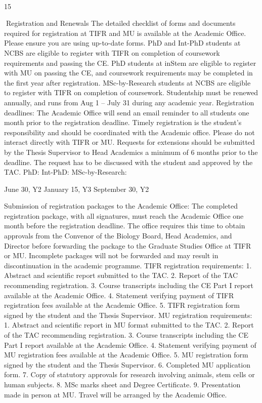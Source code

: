 \documentclass[a4paper,10pt]{article}
\begin{document}
	
  

15	
  

Registration and Renewals
The detailed checklist of forms and documents required for registration at TIFR and MU is
available at the Academic Office. Please ensure you are using up-to-date forms. PhD and
Int-PhD students at NCBS are eligible to register with TIFR on completion of coursework
requirements and passing the CE. PhD students at inStem are eligible to register with MU on
passing the CE, and coursework requirements may be completed in the first year after
registration. MSc-by-Research students at NCBS are eligible to register with TIFR on
completion of coursework. Studentship must be renewed annually, and runs from Aug 1 –
July 31 during any academic year.
Registration deadlines: The Academic Office will send an email reminder to all students
one month prior to the registration deadline. Timely registration is the student’s
responsibility and should be coordinated with the Academic office. Please do not interact
directly with TIFR or MU. Requests for extensions should be submitted by the Thesis
Supervisor to Head Academics a minimum of 6 months prior to the deadline. The request
has to be discussed with the student and approved by the TAC.
PhD:
Int-PhD:
MSc-by-Research:

June 30, Y2
January 15, Y3
September 30, Y2

Submission of registration packages to the Academic Office: The completed registration
package, with all signatures, must reach the Academic Office one month before the
registration deadline. The office requires this time to obtain approvals from the Convenor of
the Biology Board, Head Academics, and Director before forwarding the package to the
Graduate Studies Office at TIFR or MU. Incomplete packages will not be forwarded and
may result in discontinuation in the academic programme.
TIFR registration requirements:
1. Abstract and scientific report submitted to the TAC.
2. Report of the TAC recommending registration.
3. Course transcripts including the CE Part I report available at the Academic Office.
4. Statement verifying payment of TIFR registration fees available at the Academic Office.
5. TIFR registration form signed by the student and the Thesis Supervisor.
MU registration requirements:
1. Abstract and scientific report in MU format submitted to the TAC.
2. Report of the TAC recommending registration.
3. Course transcripts including the CE Part I report available at the Academic Office.
4. Statement verifying payment of MU registration fees available at the Academic Office.
5. MU registration form signed by the student and the Thesis Supervisor.
6. Completed MU application form.
7. Copy of statutory approvals for research involving animals, stem cells or human subjects.
8. MSc marks sheet and Degree Certificate.
9. Presentation made in person at MU. Travel will be arranged by the Academic Office.
\end{document}
